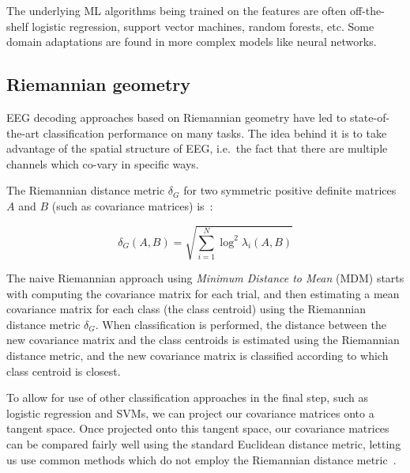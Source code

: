     The underlying ML algorithms being trained on the features are often off-the-shelf logistic regression, support vector machines, random forests, etc. Some domain adaptations are found in more complex models like neural networks.



    \subsection{Riemannian geometry}\label{section:riemannian-theory}


        EEG decoding approaches based on Riemannian geometry have led to state-of-the-art classification performance on many tasks. The idea behind it is to take advantage of the spatial structure of EEG, i.e.\ the fact that there are multiple channels which co-vary in specific ways.

        The Riemannian distance metric $\delta_G$ for two symmetric positive definite matrices $A$ and $B$ (such as covariance matrices) is~\cite{grafarend_metric_2003}:

        \[ \delta_G(A, B) = \sqrt{\sum_{i=1}^N \log^2 \lambda_i (A, B) } \]

        The naive Riemannian approach using \emph{Minimum Distance to Mean} (MDM) starts with computing the covariance matrix for each trial, and then estimating a mean covariance matrix for each class (the class centroid) using the Riemannian distance metric $\delta_G$. When classification is performed, the distance between the new covariance matrix and the class centroids is estimated using the Riemannian distance metric, and the new covariance matrix is classified according to which class centroid is closest.

        To allow for use of other classification approaches in the final step, such as logistic regression and SVMs, we can project our covariance matrices onto a tangent space. Once projected onto this tangent space, our covariance matrices can be compared fairly well using the standard Euclidean distance metric, letting us use common methods which do not employ the Riemannian distance metric~\cite{congedo_riemannian_2017}.

        

